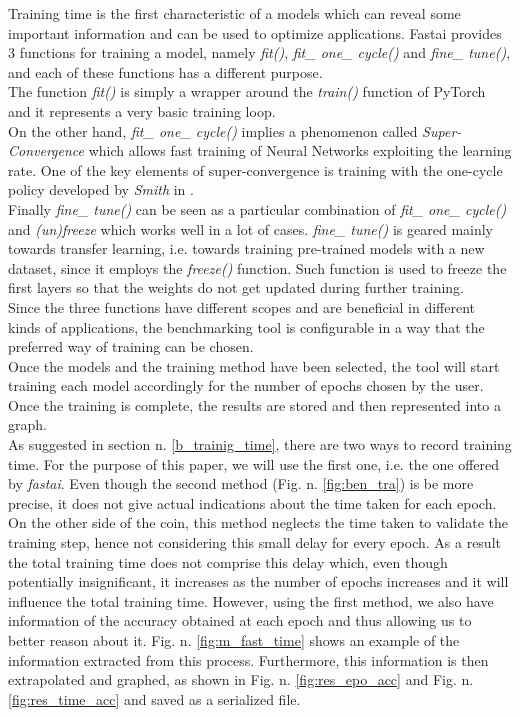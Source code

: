 Training time is the first characteristic of a models which can reveal some important information and can be used to optimize applications. 
Fastai provides 3 functions for training a model, namely \textit{fit()}, \textit{fit\_ one\_ cycle()} and \textit{fine\_ tune()}, and each of these functions has a different purpose.\\
The function \textit{fit()} is simply a wrapper around the \textit{train()} function of PyTorch and it represents a very basic training loop.\cite{fastaidocs} \\
On the other hand, \textit{fit\_ one\_ cycle()} implies a phenomenon called \textit{Super-Convergence} which allows fast training of Neural Networks exploiting the learning rate. \cite{DBLP:journals/corr/abs-1708-07120}
One of the key elements of super-convergence is training with the one-cycle policy developed by \textit{Smith} in \cite{DBLP:journals/corr/abs-1803-09820}. \cite{DBLP:journals/corr/abs-1708-07120}\\
Finally \textit{fine\_ tune()} can be seen as a particular combination of \textit{fit\_ one\_ cycle()} and \textit{(un)freeze} which works well in a lot of cases. \textit{fine\_ tune()} is geared mainly towards transfer learning, i.e. towards training pre-trained models with a new dataset, since it employs the \textit{freeze()} function. Such function is used to freeze the first layers so that the weights do not get updated during further training.\cite{fastaidocs}\\
Since the three functions have different scopes and are beneficial in different kinds of applications, the benchmarking tool is configurable in a way that the preferred way of training can be chosen. \\
Once the models and the training method have been selected, the tool will start training each model accordingly for the number of epochs chosen by the user. Once the training is complete, the results are stored and then represented into a graph. \\
As suggested in section n. \ref{b_trainig_time}, there are two ways to record training time. For the purpose of this paper, we will use the first one, i.e. the one offered by \textit{fastai}. Even though the second method (Fig. n. \ref{fig:ben_tra}) is be more precise, it does not give actual indications about the time taken for each epoch. On the other side of the coin, this method neglects the time taken to validate the training step, hence not considering this small delay for every epoch. As a result the total training time does not comprise this delay which, even though potentially insignificant, it increases as the number of epochs increases and it will influence the total training time. However, using the first method, we also have information of the accuracy obtained at each epoch
and thus allowing us to better reason about it. Fig. n. \ref{fig:m_fast_time} shows an example of the information extracted from this process. Furthermore, this information is then extrapolated and graphed, as shown in Fig. n. \ref{fig:res_epo_acc} and Fig. n. \ref{fig:res_time_acc} and saved as a serialized file. 




